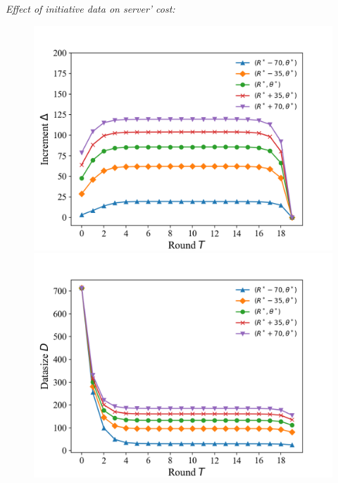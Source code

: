 \documentclass{article}
\theoremstyle{plain}
\theoremstyle{definition}
\theoremstyle{remark}
\begin{document}
\textit{Effect of initiative data on server' cost:}
\begin{figure}
	\begin{minipage}{0.32\linewidth}
		\vspace{3pt}
		\centerline{\includegraphics[width=\textwidth]{figures/figure_55_A.png}}
	\end{minipage}
	\begin{minipage}{0.32\linewidth}
		\vspace{3pt}
		\centerline{\includegraphics[width=\textwidth]{figures/figure_55_B.png}}
	\end{minipage}
  \begin{minipage}{0.32\linewidth}

\end{minipage}
\end{figure}
\end{document}
